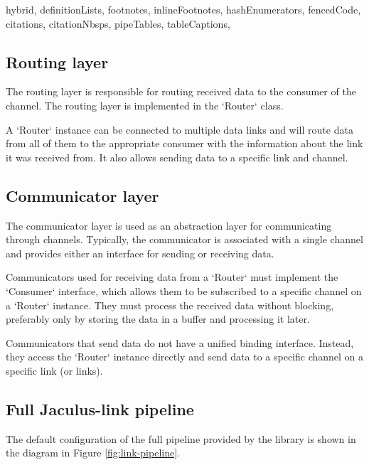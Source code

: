 \begin{markdown*}{%
  hybrid,
  definitionLists,
  footnotes,
  inlineFootnotes,
  hashEnumerators,
  fencedCode,
  citations,
  citationNbsps,
  pipeTables,
  tableCaptions,
}
\subsection{Routing layer}

The routing layer is responsible for routing received data to the consumer of the channel. The routing layer is implemented in the `Router` class.

A `Router` instance can be connected to multiple data links and will route data from all of them to the appropriate consumer with the information about the link it was received from. It also allows sending data to a specific link and channel.

\subsection{Communicator layer}

The communicator layer is used as an abstraction layer for communicating through channels. Typically, the communicator is associated with a single channel and provides either an interface for sending or receiving data.

Communicators used for receiving data from a `Router` must implement the `Consumer` interface, which allows them to be subscribed to a specific channel on a `Router` instance. They must process the received data without blocking, preferably only by storing the data in a buffer and processing it later.

Communicators that send data do not have a unified binding interface. Instead, they access the `Router` instance directly and send data to a specific channel on a specific link (or links).

\subsection{Full Jaculus-link pipeline}

The default configuration of the full pipeline provided by the library is shown in the diagram in Figure \ref{fig:link-pipeline}.


\end{markdown*}
